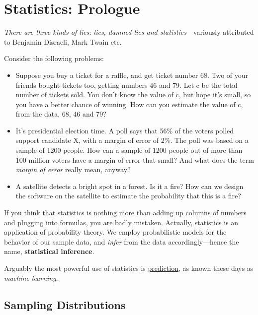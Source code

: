 \chapter{Statistics:  Prologue}
\label{chap:statprologue} 

{\it There are three kinds of lies:  lies, damned lies and
statistics}---variously attributed to Benjamin Disraeli, Mark Twain etc. 

Consider the following problems:

\begin{itemize}

\item Suppose you buy a ticket for a raffle, and get ticket number 68.
Two of your friends bought tickets too, getting numbers 46 and 79.  Let
c be the total number of tickets sold.  You don't know the value of c,
but hope it's small, so you have a better chance of winning.  How can
you estimate the value of c, from the data, 68, 46 and 79?

\item It's presidential election time.  A poll says that 56\% of the
voters polled support candidate X, with a margin of error of 2\%.  The
poll was based on a sample of 1200 people.  How can a sample of 1200
people out of more than 100 million voters have a margin of error that
small?  And what does the term {\it margin of error} really mean,
anyway?

\item A satellite detects a bright spot in a forest.  Is it a fire?  How
can we design the software on the satellite to estimate the probability
that this is a fire?

\end{itemize}

If you think that statistics is nothing more than adding up columns of
numbers and plugging into formulas, you are badly mistaken.  Actually,
statistics is an application of probability theory.  We employ
probabilistic models for the behavior of our sample data, and {\it infer}
from the data accordingly---hence the name, {\bf statistical inference}. 

Arguably the most powerful use of statistics is \underline{prediction},
as known these days as {\it machine learning}.

\section{Sampling Distributions}
\label{startcrucial}

